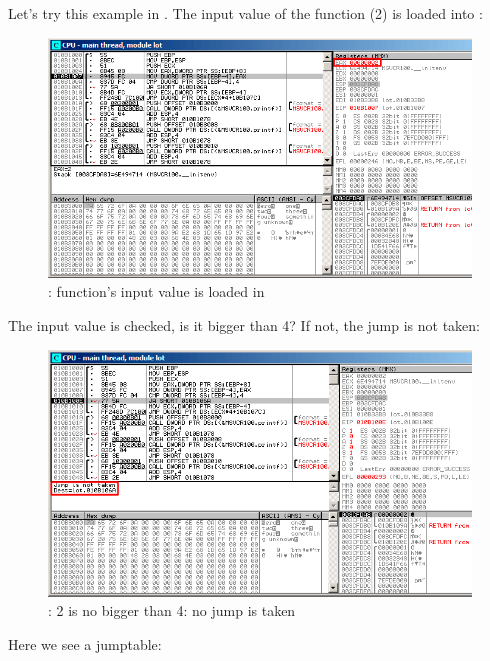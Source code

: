 ﻿\clearpage
\myparagraph{\olly}
\myindex{\olly}

Let's try this example in \olly.
The input value of the function (2) is loaded into \EAX: 

\begin{figure}[H]
\centering
\includegraphics[scale=\FigScale]{patterns/08_switch/2_lot/olly1.png}
\caption{\olly: function's input value is loaded in \EAX}
\label{fig:switch_lot_olly1}
\end{figure}

\clearpage
The input value is checked, is it bigger than 4? 
If not, the  jump is not taken:
\begin{figure}[H]
\centering
\includegraphics[scale=\FigScale]{patterns/08_switch/2_lot/olly2.png}
\caption{\olly: 2 is no bigger than 4: no jump is taken}
\label{fig:switch_lot_olly2}
\end{figure}

\clearpage
Here we see a jumptable:


